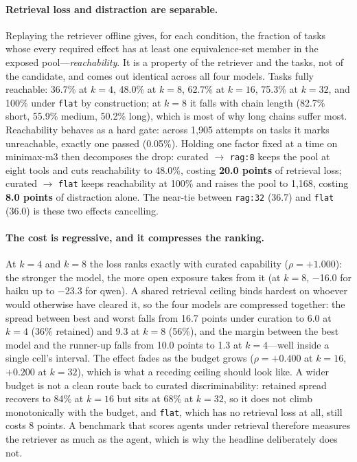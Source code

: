 \paragraph{Retrieval loss and distraction are separable.} Replaying the
retriever offline gives, for each condition, the fraction of tasks whose every
required effect has at least one equivalence-set member in the exposed
pool---\emph{reachability}. It is a property of the retriever and the tasks, not
of the candidate, and comes out identical across all four models. Tasks fully
reachable: 36.7\% at $k{=}4$, 48.0\% at $k{=}8$, 62.7\% at $k{=}16$, 75.3\% at
$k{=}32$, and 100\% under \texttt{flat} by construction; at $k{=}8$ it falls with
chain length (82.7\% short, 55.9\% medium, 50.2\% long), which is most of why
long chains suffer most. Reachability behaves as a hard gate: across 1{,}905
attempts on tasks it marks unreachable, exactly one passed
(0.05\%). Holding one factor fixed at a time on minimax-m3 then
decomposes the drop: curated \(\rightarrow\) \texttt{rag:8} keeps the pool at
eight tools and cuts reachability to 48.0\%, costing \textbf{20.0 points} of
retrieval loss; curated \(\rightarrow\) \texttt{flat} keeps reachability at 100\%
and raises the pool to 1{,}168, costing \textbf{8.0 points} of distraction
alone. The near-tie between \texttt{rag:32} (36.7) and \texttt{flat} (36.0) is
these two effects cancelling.

\paragraph{The cost is regressive, and it compresses the ranking.} At $k{=}4$
and $k{=}8$ the loss ranks exactly with curated capability
(\(\rho = {+}1.000\)): the stronger the model, the more open exposure takes from
it (at $k{=}8$, \(-\)16.0 for haiku up to \(-\)23.3 for qwen). A shared
retrieval ceiling binds hardest on whoever would otherwise have cleared it, so
the four models are compressed together: the spread between best and worst falls
from 16.7 points under curation to 6.0 at $k{=}4$ (36\% retained) and 9.3 at
$k{=}8$ (56\%), and the margin between the best model and the runner-up falls
from 10.0 points to 1.3 at $k{=}4$---well inside a single cell's interval. The
effect fades as the budget grows (\(\rho = {+}0.400\) at $k{=}16$, \({+}0.200\)
at $k{=}32$), which is what a receding ceiling should look like. A wider budget
is not a clean route back to curated discriminability: retained spread recovers
to 84\% at $k{=}16$ but sits at 68\% at $k{=}32$, so it does not climb
monotonically with the budget, and \texttt{flat}, which has no retrieval loss at
all, still costs 8 points. A benchmark that scores agents under retrieval therefore
measures the retriever as much as the agent, which is why the headline
deliberately does not.

